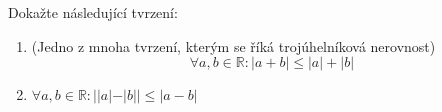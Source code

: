 Dokažte následující tvrzení:
\begin{enumerate}

	\item  (Jedno z mnoha tvrzení, kterým se říká trojúhelníková nerovnost)
		$$\forall a, b \in \mathbb{R}\colon |a+b| \leq |a| + |b|$$

	\item  $\forall a, b \in \mathbb{R}\colon ||a| - |b|| \leq |a - b|$

\end{enumerate}

